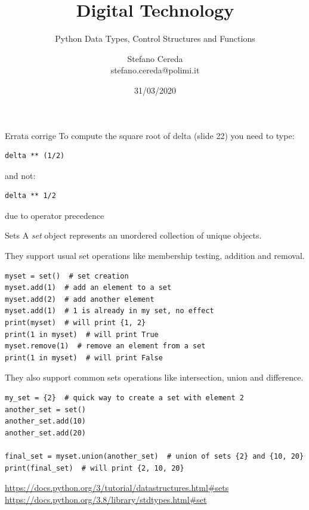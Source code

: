 \documentclass[aspectratio=169,handout]{beamer}
\title{Digital Technology}
\subtitle{Python Data Types, Control Structures and Functions}
\author{Stefano Cereda\\
		stefano.cereda@polimi.it
	}
\date{31/03/2020}
\institute[PoliMi]{Politecnico Milano}
\begin{document}
\begin{frame}
	\maketitle
\end{frame}

\begin{frame}[fragile]{Errata corrige}
    To compute the square root of delta (slide 22) you need to type:
    \begin{verbatim}
delta ** (1/2)
    \end{verbatim}
    and not:
    \begin{verbatim}
delta ** 1/2
    \end{verbatim}
    due to operator precedence
\end{frame}


\begin{frame}{Sets}
    A \emph{set} object represents an \alert{unordered} collection of \alert{unique} objects.

    They support usual set operations like membership testing, addition and removal.
        \begin{verbatim}
myset = set()  # set creation
myset.add(1)  # add an element to a set
myset.add(2)  # add another element
myset.add(1)  # 1 is already in my set, no effect
print(myset)  # will print {1, 2}
print(1 in myset)  # will print True
myset.remove(1)  # remove an element from a set
print(1 in myset)  # will print False
        \end{verbatim}

        \framebreak
        They also support common sets operations like intersection, union and difference.
        \begin{verbatim}
my_set = {2}  # quick way to create a set with element 2
another_set = set()
another_set.add(10)
another_set.add(20)

final_set = myset.union(another_set)  # union of sets {2} and {10, 20}
print(final_set)  # will print {2, 10, 20}
        \end{verbatim}

        \footnotesize{
        \url{https://docs.python.org/3/tutorial/datastructures.html#sets}
        \url{https://docs.python.org/3.8/library/stdtypes.html#set}
        }
\end{frame}
\end{document}
